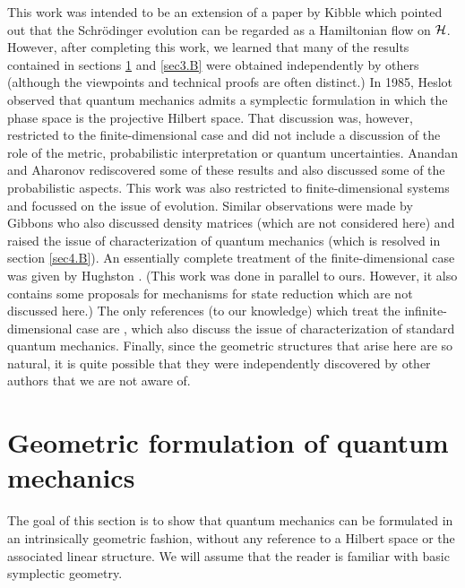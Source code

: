 \documentclass[12pt,aps,eqsecnum,tighten,nofootinbib]{revtex4-2}
\def\H{{\cal H}}
\begin{document}
This work was intended to be an extension of a paper by Kibble
{}\cite{kibble} which pointed out that the Schr\"odinger evolution can
be regarded as a Hamiltonian flow on $\H$. However, after completing
this work, we learned that many of the results contained in sections
\ref{sec2} and \ref{sec3.B} were obtained independently by others
(although the viewpoints and technical proofs are often distinct.)  In
1985, Heslot \cite{heslot} observed that quantum mechanics admits a
symplectic formulation in which the phase space is the projective
Hilbert space. That discussion was, however, restricted to the
finite-dimensional case and did not include a discussion of the role
of the metric, probabilistic interpretation or quantum uncertainties.
Anandan and Aharonov \cite{anandan} rediscovered some of these results
and also discussed some of the probabilistic aspects. This work was
also restricted to finite-dimensional systems and focussed on the
issue of evolution. Similar observations were made by Gibbons
\cite{gibbons} who also discussed density matrices (which are not
considered here) and raised the issue of characterization of quantum
mechanics (which is resolved in section \ref{sec4.B}). An essentially
complete treatment of the finite-dimensional case was given by
Hughston \cite{hughston}. (This work was done in parallel to
ours. However, it also contains some proposals for mechanisms for
state reduction \cite{hughston2} which are not discussed here.)  The
only references (to our knowledge) which treat the
infinite-dimensional case are \cite{italy1,italy2}, which also discuss
the issue of characterization of standard quantum mechanics. Finally,
since the geometric structures that arise here are so natural, it is
quite possible that they were independently discovered by other
authors that we are not aware of.


\section{Geometric formulation of quantum mechanics}\label{sec2}

The goal of this section is to show that quantum mechanics can be
formulated in an intrinsically geometric fashion, without any
reference to a Hilbert space or the associated linear structure.  We
will assume that the reader is familiar with basic symplectic
geometry.

\end{document}
